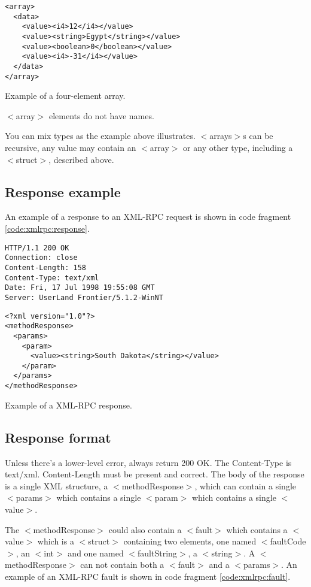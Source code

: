 \begin{code}
\begin{lstlisting}
<array>
  <data>
    <value><i4>12</i4></value>
    <value><string>Egypt</string></value>
    <value><boolean>0</boolean></value>
    <value><i4>-31</i4></value>
  </data>
</array>
\end{lstlisting}
\caption{Example of a four-element array.}
\label{code:xmlrpc:array}
\end{code}

$<$array$>$ elements do not have names.

You can mix types as the example above illustrates.
$<$arrays$>$s can be recursive, any value may contain an $<$array$>$ or any other type, including a $<$struct$>$, described above.
\subsection{Response example}
An example of a response to an XML-RPC request is shown in code fragment \ref{code:xmlrpc:response}.

\begin{code}
\begin{verbatim}
HTTP/1.1 200 OK
Connection: close
Content-Length: 158
Content-Type: text/xml
Date: Fri, 17 Jul 1998 19:55:08 GMT
Server: UserLand Frontier/5.1.2-WinNT
\end{verbatim}

\begin{lstlisting}
<?xml version="1.0"?>
<methodResponse>
  <params>
    <param>
      <value><string>South Dakota</string></value>
    </param>
  </params>
</methodResponse>
\end{lstlisting}
\caption{Example of a XML-RPC response.}
\label{code:xmlrpc:response}
\end{code}

\subsection{Response format}

Unless there's a lower-level error, always return 200 OK.
The Content-Type is text/xml. Content-Length must be present and correct.
The body of the response is a single XML structure, a $<$methodResponse$>$, which can contain a single $<$params$>$ which contains a single $<$param$>$ which contains a single $<$value$>$.

The $<$methodResponse$>$ could also contain a $<$fault$>$ which contains a $<$value$>$ which is a $<$struct$>$ containing two elements, one named $<$faultCode$>$, an $<$int$>$ and one named $<$faultString$>$, a $<$string$>$.
A $<$methodResponse$>$ can not contain both a $<$fault$>$ and a $<$params$>$.
An example of an XML-RPC fault is shown in code fragment \ref{code:xmlrpc:fault}.

